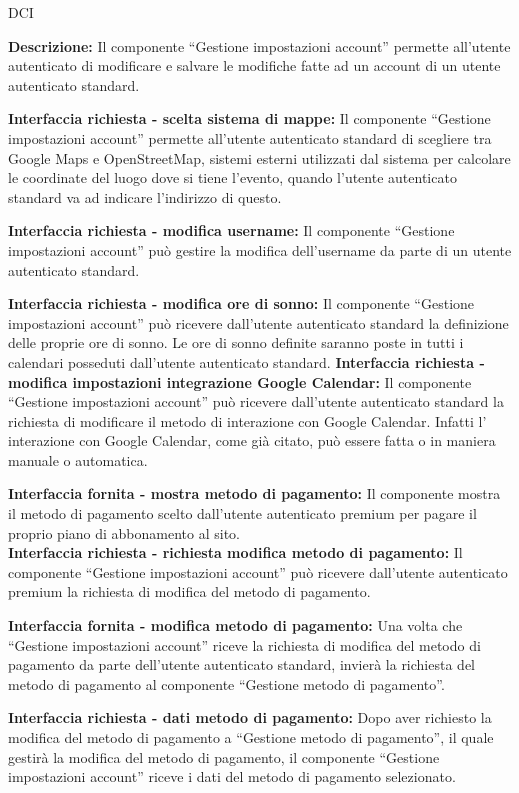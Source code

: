 \begin{listaPersonale}{DCI}

    \textbf{Descrizione:} Il componente “Gestione impostazioni account” permette all'utente autenticato di modificare e salvare le modifiche fatte ad un account di un utente autenticato standard.

    \textbf{Interfaccia richiesta - scelta sistema di mappe:} Il componente “Gestione impostazioni account” permette all'utente autenticato standard di scegliere tra Google Maps e OpenStreetMap, sistemi esterni utilizzati dal sistema per calcolare le coordinate del luogo dove si tiene l'evento, quando l'utente autenticato standard va ad indicare l'indirizzo di questo.

    \textbf{Interfaccia richiesta - modifica username:} Il componente “Gestione impostazioni account” può gestire la modifica dell'username da parte di un utente autenticato standard.

    \textbf{Interfaccia richiesta - modifica ore di sonno:} Il componente “Gestione impostazioni account” può ricevere dall'utente autenticato standard la definizione delle proprie ore di sonno. Le ore di sonno definite saranno poste in tutti i calendari posseduti dall'utente autenticato standard.
    \textbf{Interfaccia richiesta - modifica impostazioni integrazione
        Google Calendar:} Il componente “Gestione impostazioni account” può ricevere dall'utente autenticato standard la richiesta di modificare il metodo di interazione con Google Calendar. Infatti l' interazione con Google Calendar, come già citato, può essere fatta o in maniera manuale o automatica.

    \textbf{Interfaccia fornita - mostra metodo di pagamento:} Il componente mostra il metodo di pagamento scelto dall'utente autenticato premium per pagare il proprio piano di abbonamento al sito. \\
    \textbf{Interfaccia richiesta - richiesta modifica metodo di
        pagamento:} Il componente “Gestione impostazioni account” può ricevere dall'utente autenticato premium la richiesta di modifica del metodo di pagamento.

    \textbf{Interfaccia fornita - modifica metodo di pagamento:} Una volta che “Gestione impostazioni account” riceve la richiesta di modifica del metodo di pagamento da parte dell'utente autenticato standard, invierà la richiesta del metodo di pagamento al componente “Gestione metodo di pagamento”.

    \textbf{Interfaccia richiesta - dati metodo di pagamento:} Dopo aver richiesto la modifica del metodo di pagamento a “Gestione metodo di pagamento”, il quale gestirà la modifica del metodo di pagamento, il componente “Gestione impostazioni account” riceve i dati del metodo di pagamento selezionato.


\end{listaPersonale}
